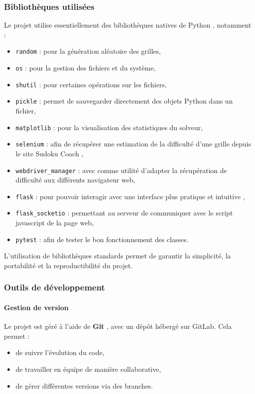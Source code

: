 \documentclass[a4paper]{article}
\begin{document}
\subsubsection{Bibliothèques utilisées}

Le projet utilise essentiellement des bibliothèques natives de Python \textbf{\cite{python}}, notamment :
\begin{itemize}
    \item \texttt{random} : pour la génération aléatoire des grilles,
    \item \texttt{os} : pour la gestion des fichiers et du système,
    \item \texttt{shutil} : pour certaines opérations sur les fichiers,
    \item \texttt{pickle} : permet de sauvegarder directement des objets Python dans un fichier,
    \item \texttt{matplotlib} : pour la visualisation des statistiques du solveur,
    \item \texttt{selenium}  \textbf{\cite{coursAGL}}: afin de récupérer une estimation de la difficulté d'une grille depuis le site Sudoku Coach \textbf{\cite{sudokucoach}},
    \item \texttt{webdriver\_manager} : avec comme utilité d'adapter la récupération de difficulté aux différents navigateur web,
    \item \texttt{flask} : pour pouvoir interagir avec une interface plus pratique et intuitive \textbf{\cite{flask}},
    \item \texttt{flask\_socketio} : permettant au serveur de communiquer avec le script javascript de la page web,
    \item \texttt{pytest} : afin de tester le bon fonctionnement des classes.
\end{itemize}

L’utilisation de bibliothèques standards permet de garantir la simplicité, la portabilité et la reproductibilité du projet.

\subsubsection{Outils de développement}

\paragraph{Gestion de version}

Le projet est géré à l’aide de \textbf{Git} \textbf{\cite{git}}, avec un dépôt hébergé sur GitLab. Cela permet :
\begin{itemize}
    \item de suivre l’évolution du code,
    \item de travailler en équipe de manière collaborative,
    \item de gérer différentes versions via des branches.
\end{itemize}
\end{document}
